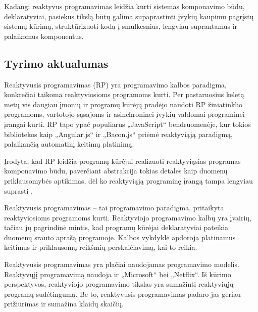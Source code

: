 Kadangi reaktyvus programavimas leidžia kurti sistemas komponavimo būdu, deklaratyviai, pasiekus tikslą būtų galima supaprastinti įvykių kaupimu pagrįstų sistemų kūrimą, struktūrizuoti kodą į smulkesnius, lengviau suprantamus ir palaikomus komponentus.


\subsection{Tyrimo aktualumas}

Reaktyvusis programavimas (RP) yra programavimo kalbos paradigma, konkrečiai taikoma reaktyviosioms programoms kurti. Per pastaruosius keletą metų vis daugiau įmonių ir programų kūrėjų pradėjo naudoti RP žiniatinklio programoms, vartotojo sąsajoms ir asinchroninei įvykių valdomai programinei įrangai kurti. RP tapo ypač populiarus „JavaScript“ bendruomenėje, kur tokios bibliotekos kaip „Angular.js“ ir „Bacon.js“ priėmė reaktyviąją paradigmą, palaikančią automatinį keitimų platinimą.

Įrodyta, kad RP leidžia programų kūrėjui realizuoti reaktyviąsias programas komponavimo būdu, paverčiant abstrakcija tokias detales kaip duomenų priklausomybės aptikimas, dėl ko reaktyviąją programinę įrangą tampa lengviau suprasti \cite{Cooper:2006:EDD:2182132.2182152, Meyerovich:2009:FPL:1639949.1640091, Salvaneschi:2014:RBO:2577080.2577083}.

Reaktyvusis programavimas – tai programavimo paradigma, pritaikyta reaktyviosioms programoms kurti. Reaktyviojo programavimo kalbų yra įvairių, tačiau jų pagrindinė mintis, kad programų kūrėjai deklaratyviai pateikia duomenų srauto aprašą programoje. Kalbos vykdyklė apdoroja platinamus keitimus ir priklausomų reikšmių perskaičiavimą, kai to reikia.

Reaktyvusis programavimas yra plačiai naudojamas programavimo modelis. Reaktyvųjį programavimą naudoja ir „Microsoft“ bei „Netflix“. Iš kūrimo perspektyvos, reaktyviojo programavimo tikslas yra sumažinti reaktyviųjų programų sudėtingumą. Be to, reaktyvusis programavimas padaro jas geriau prižiūrimas ir sumažina klaidų skaičių.

